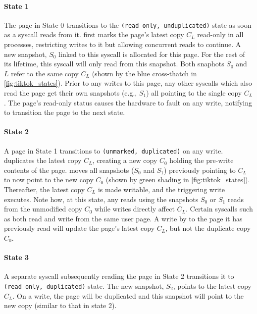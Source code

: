 \documentclass[letterpaper,twocolumn,10pt, anonymous]{article}
\begin{document}
\paragraph{State 1}
The page in State 0 transitions to the \texttt{(read-only, unduplicated)} state as soon as a syscall 
reads from it.
\tiktok first marks the page's latest copy $C_L$ read-only in all processes, 
restricting  writes to it but allowing concurrent reads to continue.
A new snapshot, $S_0$ linked to this syscall is allocated for this page.
For the rest of its lifetime, this syscall will only read from this snapshot.
Both snaphots $S_0$ and $L$ refer to the same copy $C_L$ (shown by the 
blue cross-thatch in \autoref{fig:tiktok_states}).
Prior to any writes to this page, any other syscalls which also read the page  
get their own snapshots (e.g., $S_1$) all pointing to the single copy $C_L$.
The page's read-only status causes the hardware to fault on any write,
notifying \tiktok to transition the page to the next state.

\paragraph{State 2}
A page in State 1 transitions to \texttt{(unmarked, duplicated)} on any write.
\tiktok duplicates the latest copy $C_L$, creating a new copy $C_0$ holding
the pre-write contents of the page.
\tiktok moves all snapshots ($S_0$ and $S_1$) previously pointing to 
$C_L$ to now point to the new copy $C_0$ (shown by green shading in 
\autoref{fig:tiktok_states}). 
Thereafter, the latest copy $C_L$ is made writable, and the triggering write
executes. 
Note how, at this state, any reads using the snapshots $S_0$ or $S_1$ reads 
from the unmodified copy $C_0$ while writes directly affect $C_L$.
Certain syscalls such as  both read and write from 
the same user page. 
A write by  to the page it has previously read will update
the page's latest copy $C_L$, but not the duplicate copy $C_0$.

\paragraph{State 3}
A separate syscall subsequently reading the page in State 2 transitions 
it to \texttt{(read-only, duplicated)} state. 
The new snapshot, $S_2$, points to the latest copy $C_L$.
On a write, the page will be duplicated and this snapshot 
will point to the new copy (similar to that in state 2).
\end{document}
